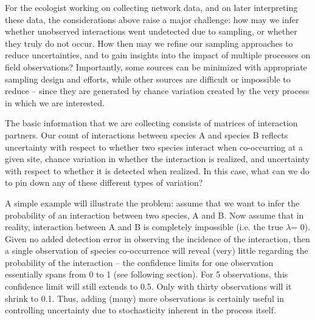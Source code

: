 ﻿\documentclass[12pt]{article}
\begin{document}
  For the ecologist working on collecting network data, and on later interpreting these data, the considerations above raise a major challenge: how may we infer whether unobserved interactions went undetected due to sampling, or whether they truly do not occur. How then may we refine our sampling approaches to reduce uncertainties, and to gain insights into the impact of multiple processes on field observations? Importantly, some sources can be minimized with appropriate sampling design and efforts, while other sources are difficult or impossible to reduce – since they are generated by chance variation created by the very process in which we are interested.


  The basic information that we are collecting consists of matrices of interaction partners. Our count of interactions between species A and species B reflects uncertainty with respect to whether two species interact when co-occurring at a given site, chance variation in whether the interaction is realized, and uncertainty with respect to whether it is detected when realized. In this case, what can we do to pin down any of these different types of variation?


  A simple example will illustrate the problem: assume that we want to infer the probability of an interaction between two species, A and B. Now assume that in reality, interaction between A and B is completely impossible (i.e. the true $\lambda$= 0). Given no added detection error in observing the incidence of the interaction, then a single observation of species co-occurrence will reveal (very) little regarding the probability of the interaction – the confidence limits for one observation essentially spans from 0 to 1 (see following section). For 5 observations, this confidence limit will still extends to 0.5. Only with thirty observations will it shrink to 0.1. Thus, adding (many) more observations is certainly useful in controlling uncertainty due to stochasticity inherent in the process itself.
\end{document}
